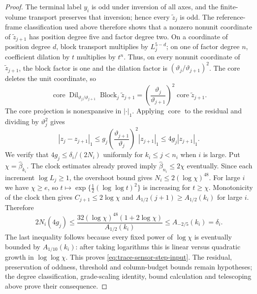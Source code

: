 \begin{proof}
The terminal label $y_i$ is
odd under inversion of all axes, and the finite-volume transport preserves
that inversion; hence every $\widetilde z_j$ is odd. The reference-frame classification
used above therefore shows that a nonzero nonunit coordinate of $\widetilde z_{j+1}$ has
position degree five and factor degree two. On a coordinate of position
degree $d$, block transport multiplies by
$L_j^{5-d}$; on one of factor degree $n$, coefficient dilation by $t$
multiplies by $t^n$. Thus, on every nonunit coordinate of $\widetilde z_{j+1}$,
the block factor is one and the dilation factor is
$(\vartheta_j/\vartheta_{j+1})^2$. The core deletes the unit coordinate, so
\begin{equation}
 \operatorname{core}\operatorname{Dil}_{\vartheta_j/\vartheta_{j+1}}\operatorname{Block}_j\widetilde z_{j+1}
 =\left(\frac{\vartheta_j}{\vartheta_{j+1}}\right)^2\operatorname{core}\widetilde z_{j+1}.
 \label{eq:trace-sensor-grade-scaling}
\end{equation}
The core projection is nonexpansive in $|\cdot|_1$.
Applying $\operatorname{core}$ to the residual and dividing by $\vartheta_j^2$ gives
\[
 |z_j-z_{j+1}|_1
 \le g_j\left(\frac{\vartheta_{j+1}}{\vartheta_j}\right)^2|z_{j+1}|_1
 \le4g_j|z_{j+1}|_1.
\]
We verify that
$4g_j\le\delta_i/(2N_i)$ uniformly for $k_i\le j<n_i$ when $i$ is large.
Put $\chi=\widehat\beta_{k_i}$. The clock estimates already proved imply
$\widehat\beta_{n_i}\le2\chi$ eventually. Since each increment
$\log L_j\ge1$, the overshoot bound gives $N_i\le2(\log \chi)^{48}$.
For large $i$ we have $\chi\ge e$, so
$t\mapsto\exp\{\tfrac12(\log\log t)^2\}$ is increasing for $t\ge\chi$.
Monotonicity of the clock then gives $C_{j+1}\le2\log \chi$ and
$A_{1/2}(j+1)\ge A_{1/2}(k_i)$ for large $i$. Therefore
\[
 2N_i(4g_j)\le
 \frac{32(\log \chi)^{48}(1+2\log \chi)}{A_{1/2}(k_i)}
 \le A_{-2/5}(k_i)=\delta_i.
\]
The last inequality follows because every fixed power of $\log \chi$ is
eventually bounded by $A_{1/10}(k_i)$: after taking logarithms this is
linear versus quadratic growth in $\log\log \chi$. This proves
\eqref{eq:trace-sensor-step-input}. The residual, preservation of oddness, threshold and column-budget bounds
remain hypotheses; the degree classification, grade-scaling identity,
bound calculation and telescoping above prove their consequence.
\end{proof}

